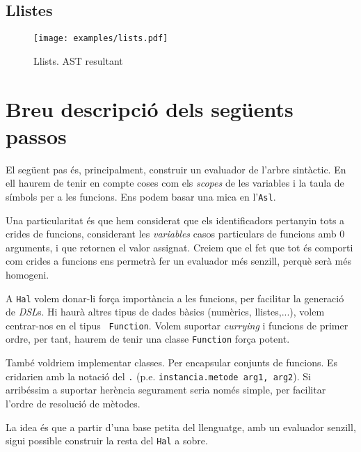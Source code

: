 \documentclass[a4paper,11pt]{article}
\newcommand{\asl}{{\tt Asl}}
\newcommand{\hal}{{\tt Hal}}
\begin{document}
\clearpage

\subsection{Llistes}

\begin{figure}[h!]
  \texttt{[image: examples/lists.pdf]}
  \caption{Llists. AST resultant}
\end{figure}

\clearpage

\section{Breu descripció dels següents passos}
El següent pas és, principalment, construir un evaluador de l'arbre sintàctic.
En ell haurem de tenir en compte coses com els \emph{scopes} de les variables
i la taula de símbols per a les funcions. Ens podem basar una mica en l'\asl.

Una particularitat és que hem considerat que els identificadors
pertanyin tots a crides de funcions, considerant les \emph{variables}
casos particulars de funcions amb 0 arguments, i que retornen el valor
assignat. Creiem que el fet que tot és comporti com crides a funcions ens permetrà
fer un evaluador més senzill, perquè serà més homogeni.

A \hal{} volem donar-li força importància a les funcions, per
facilitar la generació de \emph{DSL}s. Hi haurà altres tipus de dades
bàsics (numèrics, llistes,...), volem centrar-nos en el tipus {\tt
  Function}.  Volem suportar \emph{currying} i funcions de primer
ordre, per tant, haurem de tenir una classe {\tt Function} força
potent.

També voldriem implementar classes. Per encapsular conjunts de
funcions. Es cridarien amb la notació del {\tt .} (p.e. {\tt instancia.metode
  arg1, arg2}). Si arribéssim a suportar herència segurament seria
només simple, per facilitar l'ordre de resolució de mètodes.

La idea és que a partir d'una base petita del llenguatge, amb un evaluador
senzill, sigui possible construir la resta del \hal{} a sobre.
\end{document}
